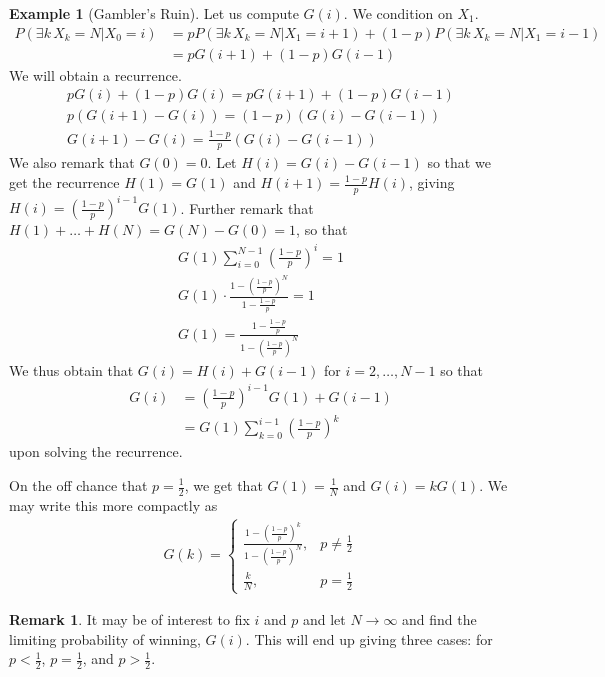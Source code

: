 \documentclass[11pt]{amsart}
\theoremstyle{definition}
\newtheorem{remark}[theorem]{Remark}
\newtheorem{example}[theorem]{Example}
\numberwithin{equation}{section}
\begin{document}
\begin{example}[Gambler's Ruin]
     Let us compute $G(i)$. We condition on $X_1$.
     \begin{align*}
         P(\exists k\, X_k=N|X_0=i)&=pP(\exists k\, X_k=N|X_1=i+1)+(1-p)P(\exists k\,X_k=N|X_1=i-1)\\
         &= pG(i+1)+(1-p)G(i-1)
     \end{align*}
     We will obtain a recurrence.
     \begin{align*}
         pG(i)+(1-p)G(i)=pG(i+1)+(1-p)G(i-1)\\
         p(G(i+1)-G(i))=(1-p)(G(i)-G(i-1))\\
         G(i+1)-G(i)=\frac{1-p}{p}(G(i)-G(i-1))
     \end{align*}
     We also remark that $G(0)=0$. Let $H(i)=G(i)-G(i-1)$ so that we get the recurrence $H(1)=G(1)$ and $H(i+1)=\frac{1-p}{p}H(i)$, giving $H(i)=\left(\frac{1-p}{p}\right)^{i-1}G(1)$. Further remark that $H(1)+\ldots+H(N)=G(N)-G(0)=1$, so that
     \begin{align*}
         G(1)\sum_{i=0}^{N-1}\left(\frac{1-p}{p}\right)^i=1\\
         G(1)\cdot\frac{1-\left(\frac{1-p}{p}\right)^N}{1-\frac{1-p}{p}}=1\\
         G(1)=\frac{1-\frac{1-p}{p}}{1-\left(\frac{1-p}{p}\right)^N}
     \end{align*}
     We thus obtain that $G(i)=H(i)+G(i-1)$ for $i=2,\ldots,N-1$ so that
     \begin{align*}
         G(i)&=\left(\frac{1-p}{p}\right)^{i-1}G(1)+G(i-1)\\
         &=G(1)\sum_{k=0}^{i-1}\left(\frac{1-p}{p}\right)^k
     \end{align*}
     upon solving the recurrence.

     On the off chance that $p=\frac{1}{2}$, we get that $G(1)=\frac{1}{N}$ and $G(i)=kG(1)$. We may write this more compactly as
     \begin{align*}
         G(k)=\begin{cases}
             \frac{1-\left(\frac{1-p}{p}\right)^k}{1-\left(\frac{1-p}{p}\right)^N}, & p\ne\frac{1}{2}\\
             \frac{k}{N}, & p=\frac{1}{2}
         \end{cases}
     \end{align*}
 \end{example}
 \begin{remark}
     It may be of interest to fix $i$ and $p$ and let $N\to\infty$ and find the limiting probability of winning, $G(i)$. This will end up giving three cases: for $p<\frac{1}{2}$, $p=\frac{1}{2}$, and $p>\frac{1}{2}$.
 \end{remark}
\end{document}
